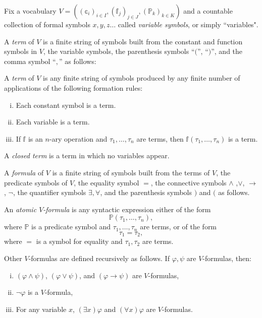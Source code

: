 \documentclass{scrartcl}
\begin{document}
Fix a vocabulary $V=((\mathbb{c}_i)_{i\in I}, (\mathbb{f}_j)_{j\in J}, (\mathbb{P}_k)_{k\in K})$ and a countable collection of formal symbols $x,y,z\dots$ called \emph{variable symbols}, or simply ``variables".

A \emph{term} of $V$ is a finite string of symbols built from the constant and function symbols in $V$, the variable symbols, the parenthesis symbols ``$($'', ``$)$'', and the comma symbol ``$,$'' as follows:

\begin{definition}
A \emph{term} of $V$ is any finite string of symbols produced by any finite number of applications of the following formation rules:
\begin{enumerate}[i)]
\item Each constant symbol is a term.
\item Each variable is a term.
\item If $\mathbb{f}$ is an $n$-ary operation and $\tau_1, \dots, \tau_n$ are terms, then $\mathbb{f}(\tau_1, \dots, \tau_n)$ is a term.
\end{enumerate}

A \emph{closed term} is a term in which no variables appear.
\end{definition}


A \emph{formula} of $V$ is a finite string of symbols built from the terms of $V$, the predicate symbols of $V$, the equality symbol $=$, the connective symbols $\land$ ,$\lor$, $\to$, $\neg$, the quantifier symbols $\exists,\forall$, and the parenthesis symbols $)$ and $($ as follows.

\begin{definition}
An \emph{atomic $V$-formula} is any syntactic expression either of the form 
\[
\mathbb{P}(\tau_1,\dots ,\tau_n),
\]
where $\mathbb{P}$ is a predicate symbol and $\tau_1,\dots ,\tau_n$ are terms, or of the form 
\[
\tau_1=\tau_2,
\]
where $=$ is a symbol for equality and $\tau_1,\tau_2$ are terms.

Other $V$-formulas are defined recursively as follows. If $\varphi, \psi $ are $V$-formulas, then:

\begin{enumerate}[i)]
\item $(\varphi\wedge\psi)$, $(\varphi\vee\psi)$, and $(\varphi\to\psi)$ are $V$-formulas,

\item $\neg\varphi$ is a $V$-formula,

\item For any variable $x$, $(\exists x)\varphi$ and $(\forall x)\varphi$ are $V$-formulas.
\end{enumerate}


\end{definition}
\end{document}

